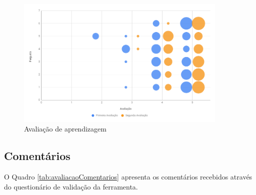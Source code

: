 \documentclass[
	12pt,				%
	oneside,			%
	a4paper,			%
	english,			%
	french,				%
	spanish,			%
	brazil,				%
	]{abntex2}
\begin{document}
\begin{figure}[H]
\centering
\caption{Avaliação de aprendizagem} \label{fig:avaliacaoAprendizagem}
\includegraphics[width=0.9\textwidth]{imagens/avaliacao_aprendizagem.png}
\sourceAuthor
\end{figure}

\subsection{Comentários}

O Quadro \ref{tab:avaliacaoComentarios} apresenta os comentários recebidos através do questionário de validação da ferramenta.
\end{document}
